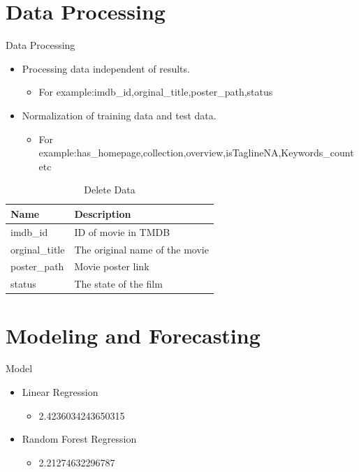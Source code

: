 \documentclass[
 size=14pt,
 paper=smartboard,  %
 mode=present, 		%
 display=slides, 	%
 style=tuliplab,  	%
 pauseslide,
 fleqn,leqno]{powerdot}
\begin{document}
\section{Data Processing}


\begin{slide}[toc=,bm=]{Data Processing}
  \begin{itemize}
    \item Processing data independent of results.
      \begin{itemize}
        \item For example:imdb_id,orginal_title,poster_path,status
      \end{itemize}
    \item  Normalization of training data and test data.
      \begin{itemize}
        \item For example:has_homepage,collection,overview,isTaglineNA,Keywords_count etc
      \end{itemize}
  \end{itemize}
  \begin{table}[htbp]
    \caption{Delete Data}
    \begin{tabular}{p{100pt} | p{200pt}}\toprule
     Name & Description  \\
         \midrule
         imdb_id
         & ID of movie in TMDB \\
         orginal_title
         & The original name of the movie\\
         poster_path
         & Movie poster link \\
         status
         &The state of the film \\
        \bottomrule
    \end{tabular}
   \end{table}
\end{slide}


\section{Modeling and Forecasting}


\begin{slide}[toc=,bm=]{Model}

\begin{itemize}
  \item Linear Regression
     \begin{itemize}
       \item 2.4236034243650315
     \end{itemize}  
  \item Random Forest Regression
     \begin{itemize}
       \item 2.21274632296787
     \end{itemize}
\end{itemize}

\end{slide}
\end{document}
